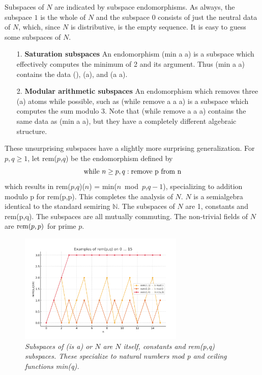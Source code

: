\documentclass[11pt]{article}
\begin{document}
    Subspaces of $N$ are indicated by subspace endomorphisms.  As always, the subspace $1$ is the whole of $N$ and the subspace $0$ consists of just the neutral data of $N$, which, 
since $N$ is distributive, is the empty sequence.  It is easy to guess some subspaces of $N$.
\begin{itemize} 
\item [1.] {\bf Saturation subspaces} An endomorphism (min a a) is a subspace which effectively computes the minimum of 2 and its argument.  Thus (min a a) contains the data (), (a), and (a a). 
\item [2.] {\bf Modular arithmetic subspaces} An endomorphism which removes three (a) atoms while possible, such as (while remove a a a) is a subspace which computes the sum modulo 3.  Note 
that (while remove a a a) contains the same data as (min a a), but they have a completely different algebraic structure.  
\end{itemize}
These unsurprising subspaces have a slightly more surprising generalization.  For $p,q\ge 1$, let rem($p$,$q$) be the endomorphism defined by 
\begin{equation}
{\rm while}\ n\ge p,q: {\rm remove\ p\ from\ n}
\end{equation}
which results in rem($p$,$q$)($n$) = min($n$\ mod\ $p$,$q-1$), specializing to addition modulo p for rem(p,p).  This completes the analysis of $N$.  $N$ is 
a semialgebra identical to the standard semiring $\mathbb N$.  The subspaces of $N$ are 1, constants and rem(p,q)\cite{rem}.  The subspaces are
all mutually commuting.  The non-trivial fields of $N$ are ${\rm rem}(p,p)$ for prime $p$.  

\begin{figure}[h]
\centering
\includegraphics[width=0.7\textwidth]{rem.png}
\caption{{\it Subspaces of (is a) or $N$ are $N$ itself, constants and rem(p,q) subspaces.  These specialize to natural numbers mod p and ceiling functions min(q).}}
\end{figure}
\end{document}
